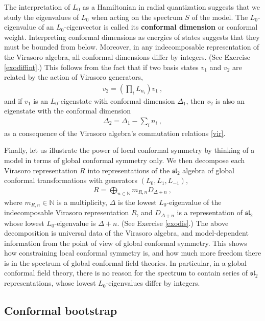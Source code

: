 \documentclass[12pt, a4paper, notitlepage, twoside]{report}
\numberwithin{equation}{section}
\theoremstyle{break}
\begin{document}
The interpretation of $L_0$ as a Hamiltonian in radial quantization suggests that we study the eigenvalues of $L_0$ when acting on the spectrum  $S$ of the model.
The $L_0$-eigenvalue of an $L_0$-eigenvector is called its \textbf{\boldmath conformal dimension} or conformal weight. 
Interpreting conformal dimensions as energies of states suggests that they
must be bounded from below.
Moreover, in any indecomposable representation of the Virasoro algebra, all conformal dimensions differ by integers. (See Exercise \ref{exodiffint}.) This follows from the fact that if 
two basis states $v_1$ and $v_2$ are related by the action of Virasoro generators,
\begin{align}
 v_2 = \left(\prod_i L_{n_i}\right) v_1\ ,
\label{vovt}
\end{align}
and if $v_1$ is an $L_0$-eigenstate with conformal dimension $\Delta_1$, then $v_2$ is also an eigenstate with the conformal dimension
\begin{align}
 \Delta_2 = \Delta_1 - \sum_i n_i\ ,
\label{ddsn}
\end{align}
as a consequence of the Virasoro algebra's commutation relations \eqref{vir}. 

Finally, let us illustrate the power of local conformal symmetry by thinking of a model in terms of global conformal symmetry only. 
We then decompose each Virasoro representation $R$ into representations of the $\mathfrak{sl}_2$ algebra of global conformal transformations with generators $(L_0,L_1,L_{-1})$,
\begin{align}
 R=\bigoplus_{n\in{\mathbb{N}}} m_{R,n} D_{\Delta+n}\ ,
\label{rbd}
\end{align}
where $m_{R,n}\in {\mathbb{N}}$ is a multiplicity, $\Delta$ is the lowest $L_0$-eigenvalue of the indecomposable Virasoro representation $R$, and $D_{\Delta+n}$ is a representation of $\mathfrak{sl}_2$ whose lowest $L_0$-eigenvalue is $\Delta+n$.
(See Exercise \ref{exodis}.)
The above decomposition is universal data of the Virasoro algebra, and 
model-dependent information from the point of view of global conformal symmetry.
This shows how constraining local conformal symmetry is, and how much more freedom there is in the spectrum of global conformal field theories.
In particular, in a global conformal field theory, there is no reason for the spectrum to contain series of
$\mathfrak{sl}_2$ representations, whose lowest $L_0$-eigenvalues differ by integers. 


\subsection{Conformal bootstrap}
\end{document}
